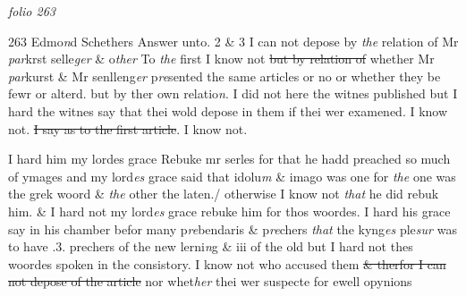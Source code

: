 \documentclass[12pt, a4paper]{book}
\begin{document}
\textit{folio 263}



{\color{Mahogany}263} Edmo\textit{n}d Schethers Answer unto.  2 \& 3 I can not depose by \textit{the} relation of Mr \textit{par}krst selle\textit{ger} \& o\textit{ther} 
				\marginpar[\vspace{0.5cm}{\textcolor{Gray}{1}}]{}
			 To \textit{the} first I know not \sout{but by relation of}
               whether 
			Mr \textit{par}kurst \& Mr senlleng\textit{er }p\textit{re}sented the  same articles or no or whether they be fewr or alterd. but by ther own relatio\textit{n}. 
				\marginpar[\vspace{0.5cm}{\textcolor{Gray}{2}}]{}
			 I did not here the witnes published but I hard the witnes say that thei wold depose in them if thei wer examened. I know not. 
				\marginpar[\vspace{0.5cm}{\textcolor{Gray}{3}}]{}
			 \sout{I say as to the first article}. I know not. 
			 
				\marginpar[\vspace{0.5cm}{\textcolor{Gray}{4}}]{}
			 I hard him my lordes grace
			 Rebuke mr serles for that he hadd preached so much of ymages and my lord\textit{es} grace
			 said that idolu\textit{m} \& imago was one for \textit{the} one was the grek woord \& \textit{the} other the laten./ otherwise I know not \textit{that} he did rebuk him. \& I hard not my lord\textit{es} grace rebuke him for thos woordes. 
				\marginpar[\vspace{0.5cm}{\textcolor{Gray}{5.}}]{}
			 I hard his grace say in his chamber befor many p\textit{re}bendaris \& p\textit{re}chers \textit{that} the kyng\textit{es} ple\textit{sur} was to have .3. prechers of the new lerni\textit{n}g \& iii of the old but I hard not thes woordes spoken in the consistory.  
				\marginpar[\vspace{0.5cm}{\textcolor{Gray}{6}}]{}
			 I know not who accused them \sout{\& therfor I can not depose of the article}
               nor whet\textit{her} thei wer suspecte for ewell opynions
			 
\end{document}
